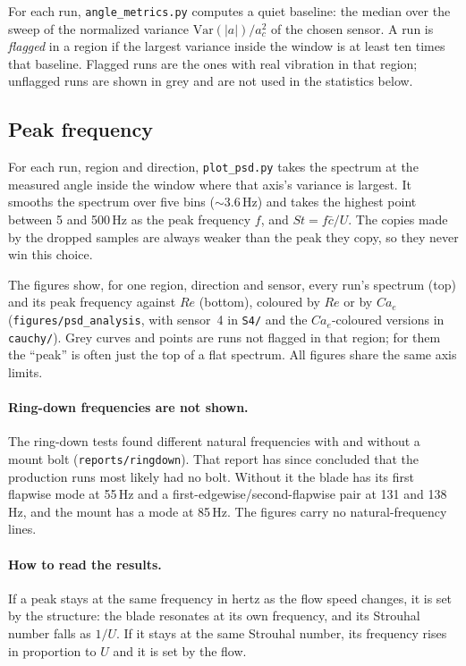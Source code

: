 \documentclass[11pt]{article}
\newcommand{\code}[1]{\texttt{#1}}
\begin{document}
For each run, \code{angle\_metrics.py} computes a quiet baseline: the median
over the sweep of the normalized variance $\mathrm{Var}(|a|)/a_c^2$ of the
chosen sensor. A run is \emph{flagged} in a region if the largest variance
inside the window is at least ten times that baseline. Flagged runs are the
ones with real vibration in that region; unflagged runs are shown in grey and
are not used in the statistics below.

\subsection{Peak frequency}

For each run, region and direction, \code{plot\_psd.py} takes the spectrum at
the measured angle inside the window where that axis's variance is largest.
It smooths the spectrum over five bins ($\sim$3.6\,Hz) and takes the highest
point between 5 and 500\,Hz as the peak frequency $f$, and $St = f\bar{c}/U$.
The copies made by the dropped samples are always weaker than the peak they
copy, so they never win this choice.

The figures show, for one region, direction and sensor, every run's spectrum
(top) and its peak frequency against $Re$ (bottom), coloured by $Re$ or by
$Ca_e$ (\code{figures/psd\_analysis}, with sensor~4 in \code{S4/} and the
$Ca_e$-coloured versions in \code{cauchy/}). Grey curves and points are runs
not flagged in that region; for them the ``peak'' is often just the top of a
flat spectrum. All figures share the same axis limits.

\paragraph{Ring-down frequencies are not shown.} The ring-down tests found
different natural frequencies with and without a mount bolt
(\code{reports/ringdown}). That report has since concluded that the
production runs most likely had no bolt. Without it the blade has its first
flapwise mode at 55\,Hz and a first-edgewise/second-flapwise pair at 131 and
138\,Hz, and the mount has a mode at 85\,Hz. The figures carry no
natural-frequency lines.

\paragraph{How to read the results.} If a peak stays at the same frequency in
hertz as the flow speed changes, it is set by the structure: the blade
resonates at its own frequency, and its Strouhal number falls as $1/U$. If it
stays at the same Strouhal number, its frequency rises in proportion to $U$
and it is set by the flow.
\end{document}
